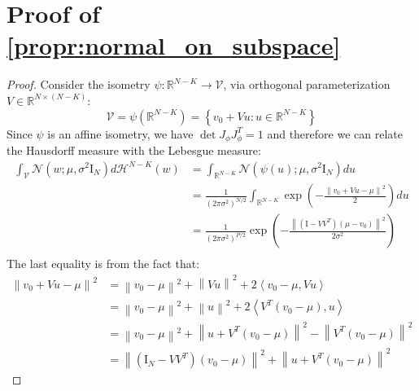 \documentclass[a4paper,10pt]{article}
\theoremstyle{definition} %
\theoremstyle{definition} %
\theoremstyle{definition} %
\theoremstyle{definition} %
\newcommand{\R}{\mathbb{R}}
\newcommand{\Normal}[1]{\mathcal{N}\left( {#1} \right)}
\newcommand{\Id}{\mathrm{I}}
\newcommand{\norm}[1]{\left\| #1 \right \|}
\newcommand{\inner}[1]{\left\langle #1 \right\rangle}
\begin{document}
\section{Proof of \cref{propr:normal_on_subspace}}\label{sec:proof_normal_on_subspace}
\begin{proof}
    Consider the isometry $\psi:\R^{N - K} \to  \mathcal{V}$, via orthogonal parameterization $V \in \R^{N \times (N - K)}$:
    \begin{equation*}
        \mathcal{V} = \psi(\R^{N-K}) = \left\{ v_0 + V u: u \in \R^{N - K} \right\}
    \end{equation*}
    Since $\psi$ is an affine isometry, we have $\det{J_{\phi} J_{\phi}^T} = 1$ and therefore we can relate the Hausdorff measure with the Lebesgue measure: 
    \begin{align*}
        \int_{\mathcal{V}} \Normal{w; \mu, \sigma^2 \Id_{N}} d \mathcal{H}^{N - K}(w)
        &=  \int_{\R^{N - K}} \Normal{\psi(u); \mu, \sigma^2 \Id_N} d u  \\
        &= \frac{1}{(2\pi\sigma^2)^{N/2}} \int_{\R^{N-K}} \exp \left( -\frac{\norm{v_0 + V u - \mu}^2}{2} \right) du \\
        &= \frac{1}{(2\pi \sigma^2)^{P/2}} \exp \left( -\frac{\norm{(\Id - V V^T)(\mu - v_0)}^2}{2\sigma^2} \right)\\
    \end{align*}
    The last equality is from the fact that: 
    \begin{align*}
        \norm{v_0+ V u - \mu}^2 &= \norm{v_0 - \mu}^2 + \norm{V u}^2 + 2 \inner{v_0 - \mu, V u} \\ 
        &= \norm{v_0 - \mu}^2 + \norm{u}^2 + 2 \inner{V^T(v_0 - \mu), u} \\
        &= \norm{v_0 - \mu}^2 + \norm{u + V^T(v_0 - \mu)}^2 - \norm{V^T(v_0 - \mu)}^2 \\
        &= \norm{(\Id_N - V V^T)(v_0 - \mu)}^2 + \norm{u + V^T(v_0 - \mu)}^2
    \end{align*}
\end{proof}


 
\end{document}
